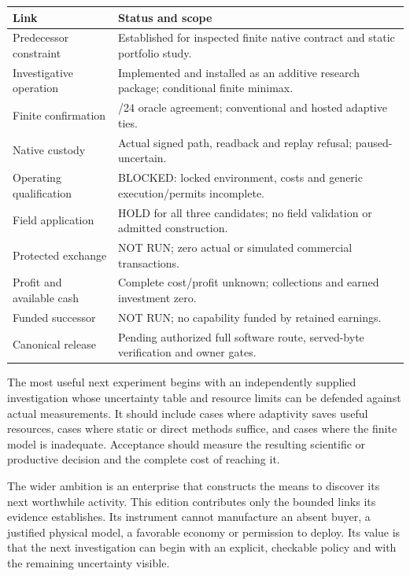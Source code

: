 \documentclass[10pt,letterpaper]{article}
\begin{document}
\begin{longtable}{>{\raggedright\arraybackslash}p{.29\linewidth}@{\hspace{16pt}}>{\raggedright\arraybackslash}p{.64\linewidth}}
\toprule\noalign{}
\begin{minipage}[b]{\linewidth}\raggedright
Link
\end{minipage} & \begin{minipage}[b]{\linewidth}\raggedright
Status and scope
\end{minipage} \\
\midrule\noalign{}
\endhead
\bottomrule\noalign{}
\endlastfoot
Predecessor constraint & Established for inspected finite native
contract and static portfolio study. \\
Investigative operation & Implemented and installed as an additive
research package; conditional finite minimax. \\
Finite confirmation & 24/24 oracle agreement; conventional and hosted
adaptive ties. \\
Native custody & Actual signed path, readback and replay refusal;
paused-uncertain. \\
Operating qualification & BLOCKED: locked environment, costs and generic
execution/permits incomplete. \\
Field application & HOLD for all three candidates; no field validation
or admitted construction. \\
Protected exchange & NOT RUN; zero actual or simulated commercial
transactions. \\
Profit and available cash & Complete cost/profit unknown; collections
and earned investment zero. \\
Funded successor & NOT RUN; no capability funded by retained
earnings. \\
Canonical release & Pending authorized full software route, served-byte
verification and owner gates. \\
\end{longtable}

The most useful next experiment begins with an independently supplied
investigation whose uncertainty table and resource limits can be
defended against actual measurements. It should include cases where
adaptivity saves useful resources, cases where static or direct methods
suffice, and cases where the finite model is inadequate. Acceptance
should measure the resulting scientific or productive decision and the
complete cost of reaching it.

The wider ambition is an enterprise that constructs the means to
discover its next worthwhile activity. This edition contributes only the
bounded links its evidence establishes. Its instrument cannot
manufacture an absent buyer, a justified physical model, a favorable
economy or permission to deploy. Its value is that the next
investigation can begin with an explicit, checkable policy and with the
remaining uncertainty visible.
\end{document}
